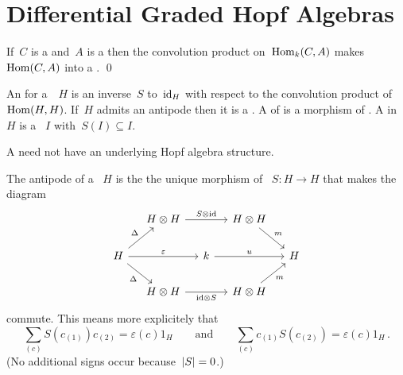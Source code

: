 \documentclass[a4paper,10pt,headings=standardclasses]{scrartcl}
\begin{document}
\section{Differential Graded Hopf Algebras}

\begin{lemma}
  If~$C$ is a {\dgc} and~$A$ is a {\dga} then the convolution product on~$\operatorname{Hom}_k(C,A)$ makes~$\operatorname{Hom}(C,A)$ into a {\dga}.
  \qed
\end{lemma}


\begin{definition}
  An  for a~{\dgb}~$H$ is an inverse~$S$ to~$\operatorname{id}_H$ with respect to the convolution product of~$\operatorname{Hom}(H,H)$.
  If~$H$ admits an antipode then it is a .
  A  of {\dghs} is a morphism of {\dgbs}.
  A  in~$H$ is a {\dgbi}~$I$ with~$S(I) \subseteq I$.
\end{definition}

\begin{warning}
  A {\dgh} need not have an underlying Hopf algebra structure.
\end{warning}

\begin{remark}
  The antipode of a {\dgh}~$H$ is the the unique morphism of {\dgvs}~$S \colon H \to H$ that makes the diagram
  \begin{equation}
    \label{antipode diagram}
    \begin{tikzcd}[column sep = small]
      {}
      &
      H \tensor H
      \arrow{rr}[above]{S \tensor {\id}}
      &
      {}
      &
      H \tensor H
      \arrow{dr}[above right]{m}
      &
      {}
      \\
      H
      \arrow{ur}[above left]{\Delta}
      \arrow{rr}[above]{\varepsilon}
      \arrow{dr}[below left]{\Delta}
      &
      {}
      &
      k
      \arrow{rr}[above]{u}
      &
      {}
      &
      H
      \\
      {}
      &
      H \tensor H
      \arrow{rr}[below]{{\id} \tensor S}
      &
      {}
      &
      H \tensor H
      \arrow{ur}[below right]{m}
      &
      {}
    \end{tikzcd}
  \end{equation}
  commute.
  This means more explicitely that
  \[
    \sum_{(c)} S(c_{(1)}) c_{(2)}
    =
    \varepsilon(c) 1_H
    \qquad\text{and}\qquad
    \sum_{(c)} c_{(1)} S(c_{(2)})
    =
    \varepsilon(c) 1_H  \,.
  \]
  (No additional signs occur because~$\lvert S\rvert = 0$.)
\end{remark}
\end{document}
